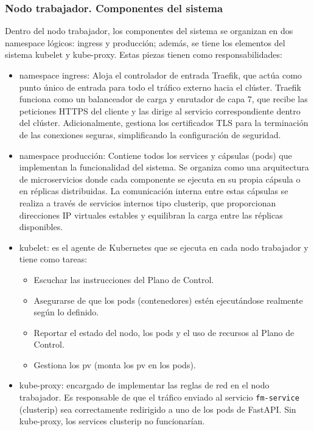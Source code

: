 \subsubsection{Nodo trabajador. Componentes del sistema}

Dentro del \gls{nodo} trabajador, los componentes del sistema se organizan en dos \gls{namespace}
lógicos: \gls{ingress} y producción; además, se tiene los elementos del sistema \gls{kubelet} y \gls{kube-proxy}.
Estas piezas tienen como responsabilidades:

\begin{itemize}
    \item \gls{namespace} \gls{ingress}: Aloja el controlador de entrada 
    \gls{Traefik}, que actúa como punto único de entrada para todo el tráfico externo hacia el clúster. 
    \gls{Traefik} funciona como un balanceador de carga y enrutador de capa 7, que recibe las peticiones 
    \ac{HTTPS} del cliente y las dirige al servicio correspondiente dentro del clúster. Adicionalmente, 
    gestiona los certificados \ac{TLS} para la terminación de las conexiones seguras, simplificando la 
    configuración de seguridad.
    
    \item \gls{namespace} producción: Contiene todos los \gls{service}s y cápsulas (\gls{pod}s) que 
    implementan la funcionalidad del sistema. Se organiza como una arquitectura de microservicios 
    donde cada componente se ejecuta en su propia cápsula o en réplicas distribuidas. La comunicación 
    interna entre estas cápsulas se realiza a través de servicios internos tipo \gls{clusterip}, 
    que proporcionan direcciones \ac{IP} virtuales estables y equilibran la carga entre las réplicas 
    disponibles.

    \item \gls{kubelet}: es el agente de Kubernetes que se ejecuta en cada \gls{nodo} trabajador y tiene como tareas: 
    \begin{itemize}
        \item Escuchar las instrucciones del Plano de Control.
        \item Asegurarse de que los \gls{pod}s (contenedores) estén ejecutándose realmente según lo definido.
        \item Reportar el estado del \gls{nodo}, los \gls{pod}s y el uso de recursos al Plano de Control.
        \item Gestiona los \gls{pv} (monta los \gls{pv} en los \gls{pod}s).
    \end{itemize}

    \item \gls{kube-proxy}: encargado de implementar las reglas de red en el \gls{nodo} trabajador.
    Es responsable de que el tráfico enviado al servicio \texttt{fm-service} (\gls{clusterip})
    sea correctamente redirigido a uno de los \gls{pod}s de FastAPI. Sin \gls{kube-proxy}, los \gls{service}s
    \gls{clusterip} no funcionarían.
    
\end{itemize}

